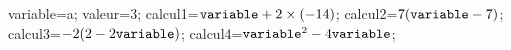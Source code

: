 \documentclass[exercice]{thedocument}%
\begin{document}
%
    \>variable=a;%
    \>valeur=3;%
    \>calcul1=${\<variable;}+2\times(-14)$;%
    \>calcul2=$7({\<variable;}-7)$;%
    \>calcul3=$-2(2-2{\<variable;})$;%
    \>calcul4=${\<variable;}^2-4{\<variable;}$;%
\end{document}

